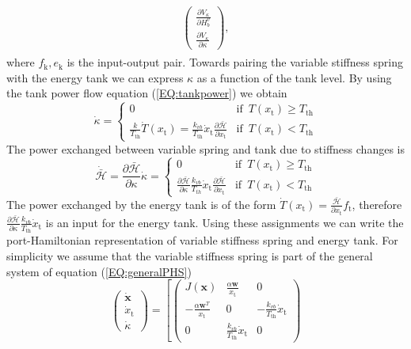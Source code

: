 \documentclass[a4paper,twoside, openright,12pt]{report}
\newcommand{\f}[1]{\boldsymbol{#1}}
\newcommand{\g}[1]{\text{#1}}
\begin{document}
{\begin{eqnarray}
\begin{aligned}
\begin{pmatrix}
\frac{\partial V_{\kappa}}{\partial H_b^v} \\ \frac{\partial V_{\kappa}}{\partial \kappa}
\end{pmatrix},
\end{aligned}
\end{eqnarray}
where $f_\g{k},e_\g{k}$ is the input-output pair. Towards pairing the variable stiffness spring with the energy tank we can express $\kappa$ as a function of the tank level. By using the tank power flow equation (\ref{EQ:tankpower}) we obtain
\begin{equation}
\dot{\kappa} = \begin{cases}
0 & \text{if } \, T(x_\g{t})\geq T_{\g{th}} \\
\frac{k}{T_{\g{th}}}\dot{T}(x_\g{t}) = \frac{k_{vb}}{T_{\g{th}}} \dot{x}_\g{t} \frac{\partial \bar{\mathcal{H}}}{\partial x_\g{t}} & \text{if }  \, T(x_\g{t}) < T_{\g{th}}
\end{cases}
\end{equation}
The power exchanged between variable spring and tank due to stiffness changes is
\begin{equation}
\dot{\bar{\mathcal{H}}} = \frac{\partial \bar{\mathcal{H}}}{\partial \kappa}\dot{\kappa} =
\begin{cases}
0 & \text{if } \, T(x_\g{t})\geq T_{\g{th}} \\
\frac{\partial \bar{\mathcal{H}}}{\partial \kappa}\frac{k_{vb}}{T_{th}} \dot{x}_\g{t} \frac{\partial \bar{\mathcal{H}}}{\partial x_\g{t}} & \text{if }  \, T(x_\g{t}) < T_{\g{th}}
\end{cases}
\end{equation}
The power exchanged by the energy tank is of the form $\dot{T}(x_\g{t}) = \frac{\bar{\mathcal{H}}}{\partial x_\g{t}}f_\g{t}$, therefore $\frac{\partial \bar{\mathcal{H}}}{\partial \kappa}\frac{k_{vb}}{T_{\g{th}}} \dot{x}_\g{t}$ is an input for the energy tank. Using these assignments we can write the port-Hamiltonian representation of variable stiffness spring and energy tank. For simplicity we assume that the variable stiffness spring is part of the general system of equation (\ref{EQ:generalPHS})
\begin{equation}
\begin{pmatrix}
\dot{\f{x}} \\ \dot{x}_\g{t} \\ \dot{\kappa}
\end{pmatrix} =
\left[
\begin{pmatrix}
J(\f{x}) & \frac{\alpha \f{w}}{x_\g{t}} & 0\\ -\frac{\alpha \f{w}^T}{x_\g{t}} & 0 & -\frac{k_{vb}}{T_{\g{th}}}\dot{x}_\g{t} \\ 0 & \frac{k_{vb}}{T_{\g{th}}}\dot{x}_\g{t} & 0\end{pmatrix}

\end{equation}}
\end{document}
